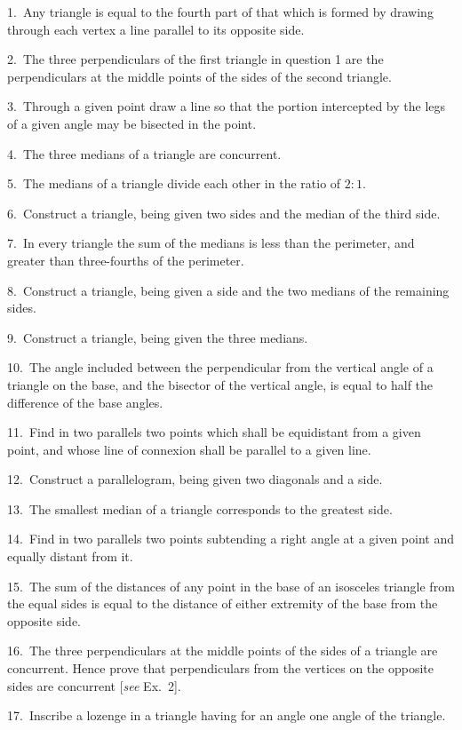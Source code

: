 \documentclass[oneside]{book}
\begin{document}
\begin{footnotesize}
1.~Any triangle is equal to the fourth part of that which is
formed by drawing through each vertex a line parallel to its
opposite side.

2.~The three perpendiculars of the first triangle in question 1
are the perpendiculars at the middle points of the sides of the
second triangle.

3.~Through a given point draw a line so that the portion
intercepted by the legs of a given angle may be bisected in the point.

4.~The three medians of a triangle are concurrent.

5.~The medians of a triangle divide each other in the ratio of
$2:1$.

6.~Construct a triangle, being given two sides and the median
of the third side.

7.~In every triangle the sum of the medians is less than the
perimeter, and greater than three-fourths of the perimeter.

8.~Construct a triangle, being given a side and the two
medians of the remaining sides.

9.~Construct a triangle, being given the three medians.

10.~The angle included between the perpendicular from the
vertical angle of a triangle on the base, and the bisector of the
vertical angle, is equal to half the difference of the base angles.

11.~Find in two parallels two points which shall be equidistant
from a given point, and whose line of connexion shall be parallel
to a given line.

12.~Construct a parallelogram, being given two diagonals and
a side.

13.~The smallest median of a triangle corresponds to the
greatest side.

14.~Find in two parallels two points subtending a right angle
at a given point and equally distant from it.

15.~The sum of the distances of any point in the base of an
isosceles triangle from the equal sides is equal to the distance of
either extremity of the base from the opposite side.

16.~The three perpendiculars at the middle points of the sides
of a triangle are concurrent. Hence prove that perpendiculars
from the vertices on the opposite sides are concurrent [\textit{see}
Ex.~2].

17.~Inscribe a lozenge in a triangle having for an angle one
angle of the triangle.


\end{footnotesize}
\end{document}

